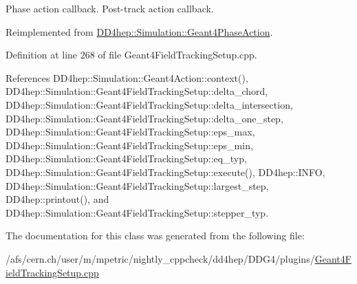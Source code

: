Phase action callback. Post-\/track action callback. 

Reimplemented from \hyperlink{class_d_d4hep_1_1_simulation_1_1_geant4_phase_action_a5d8bac662ec707a8cdff0bd3cdd9b831}{DD4hep::Simulation::Geant4PhaseAction}.

Definition at line 268 of file Geant4FieldTrackingSetup.cpp.

References DD4hep::Simulation::Geant4Action::context(), DD4hep::Simulation::Geant4FieldTrackingSetup::delta\_\-chord, DD4hep::Simulation::Geant4FieldTrackingSetup::delta\_\-intersection, DD4hep::Simulation::Geant4FieldTrackingSetup::delta\_\-one\_\-step, DD4hep::Simulation::Geant4FieldTrackingSetup::eps\_\-max, DD4hep::Simulation::Geant4FieldTrackingSetup::eps\_\-min, DD4hep::Simulation::Geant4FieldTrackingSetup::eq\_\-typ, DD4hep::Simulation::Geant4FieldTrackingSetup::execute(), DD4hep::INFO, DD4hep::Simulation::Geant4FieldTrackingSetup::largest\_\-step, DD4hep::printout(), and DD4hep::Simulation::Geant4FieldTrackingSetup::stepper\_\-typ.

The documentation for this class was generated from the following file:\begin{DoxyCompactItemize}
\item 
/afs/cern.ch/user/m/mpetric/nightly\_\-cppcheck/dd4hep/DDG4/plugins/\hyperlink{_geant4_field_tracking_setup_8cpp}{Geant4FieldTrackingSetup.cpp}\end{DoxyCompactItemize}
